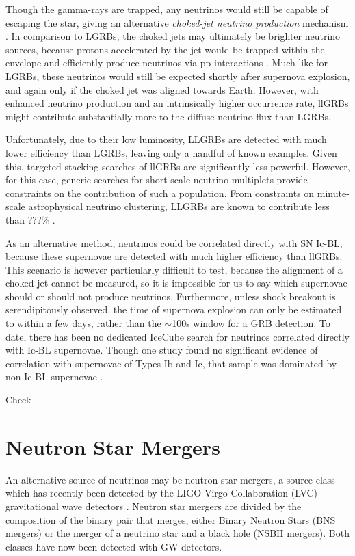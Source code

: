 Though the gamma-rays are trapped, any neutrinos would still be capable of escaping the star, giving an alternative \emph{choked-jet neutrino production} mechanism . In comparison to LGRBs, the choked jets may ultimately be brighter neutrino sources, because protons accelerated by the jet would be trapped within the envelope and efficiently produce neutrinos via pp interactions \cite{nakar_15_llgrb}. Much like for LGRBs, these neutrinos would still be expected shortly after supernova explosion, and again only if the choked jet was aligned towards Earth. However, with enhanced neutrino production and an intrinsically higher occurrence rate, llGRBs might contribute substantially more to the diffuse neutrino flux than LGRBs. 

Unfortunately, due to their low luminosity, LLGRBs are detected with much lower efficiency than LGRBs, leaving only a handful of known examples. Given this, targeted stacking searches of llGRBs are significantly less powerful. However, for this case, generic searches for short-scale neutrino multiplets provide constraints on the contribution of such a population. From constraints on minute-scale astrophysical neutrino clustering, LLGRBs are known to contribute less than ???\% .

As an alternative method, neutrinos could be correlated directly with SN Ic-BL, because these supernovae are detected with much higher efficiency than llGRBs. This scenario is however particularly difficult to test, because the alignment of a choked jet cannot be measured, so it is impossible for us to say which supernovae should or should not produce neutrinos. Furthermore, unless shock breakout is serendipitously observed, the time of supernova explosion can only be estimated to within a few days, rather than the $\sim$100s window for a GRB detection. To date, there has been no dedicated IceCube search for neutrinos correlated directly with Ic-BL supernovae. Though one study found no significant evidence of correlation with supernovae of Types Ib and Ic, that sample was dominated by non-Ic-BL supernovae \cite{Stasik2018Search}. 

Check

\section{Neutron Star Mergers}
\label{sec:ns_mergers}

An alternative source of neutrinos may be neutron star mergers, a source class which has recently been detected by the LIGO-Virgo Collaboration (LVC) gravitational wave detectors . Neutron star mergers are divided by the composition of the binary pair that merges, either Binary Neutron Stars (BNS mergers) or the merger of a neutrino star and a black hole (NSBH mergers). Both classes have now been detected with GW detectors.

